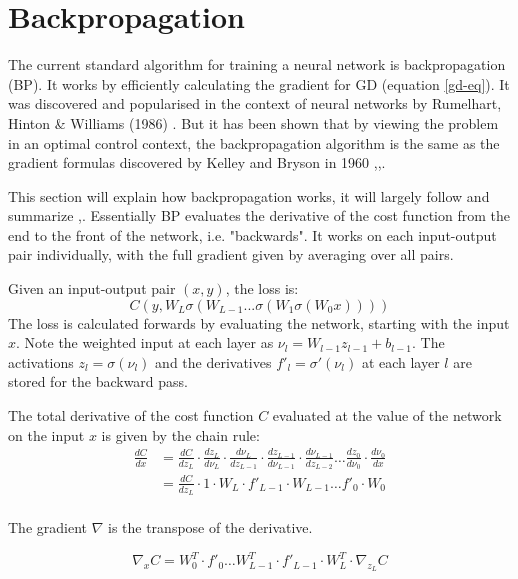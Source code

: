 \section{Backpropagation}
The current standard algorithm for training a neural network is backpropagation (BP). It works by efficiently calculating the gradient for GD (equation \ref{gd-eq}). It was discovered and popularised in the context of neural networks by Rumelhart, Hinton \& Williams (1986) \cite{Rumelhart1986}. But it has been shown that by viewing the problem in an optimal control context, the backpropagation algorithm is the same as the gradient formulas discovered by Kelley and Bryson in 1960 \cite{dreyfus1990},\cite{kelley1960},\cite{Bryson1962}.

This section will explain how backpropagation works, it will largely follow and summarize \cite{Nielsen2015},\cite{wikiback}. Essentially BP evaluates the derivative of the cost function from the end to the front of the network, i.e. "backwards". It works on each input-output pair individually, with the full gradient given by averaging over all pairs.

Given an input-output pair $(x,y)$, the loss is:
\begin{equation}
C(y,W_L\sigma(W_{L-1}...\sigma(W_1\sigma(W_0x))))
\end{equation}
The loss is calculated forwards by evaluating the network, starting with the input $x$. Note the weighted input at each layer as $\nu_l = W_{l-1}z_{l-1} + b_{l-1}$. The activations $z_l = \sigma(\nu_l)$ and the derivatives $f'_l = \sigma'(\nu_l)$ at each layer $l$ are stored for the backward pass.

The total derivative of the cost function $C$ evaluated at the value of the network on the input $x$ is given by the chain rule:
\begin{equation}
	\begin{aligned}
	\frac{dC}{dx} &= \frac{dC}{dz_L}\cdot \frac{dz_L}{d\nu_L}\cdot \frac{d\nu_L}{dz_{L-1}}\cdot \frac{dz_{L-1}}{d\nu_{L-1}} \cdot \frac{d\nu_{L-1}}{dz_{L-2}}\dots\frac{dz_0}{d\nu_0}\cdot\frac{d\nu_0}{dx} \\
	&= \frac{dC}{dz_L}\cdot 1 \cdot W_L \cdot f'_{L-1} \cdot W_{L-1} \dots f'_0 \cdot W_0 \\
	\end{aligned}
\end{equation}

The gradient $\nabla$ is the transpose of the derivative.

\begin{equation}
\nabla_xC = W_0^T \cdot f'_0 \dots W_{L-1}^T \cdot f'_{L-1} \cdot W_L^T \cdot \nabla_{z_L}C
\end{equation}

